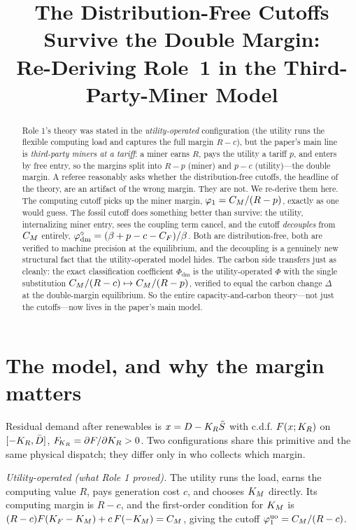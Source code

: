 \title[The cutoffs in the paper's main model]{The Distribution-Free Cutoffs Survive the Double
Margin:\\ Re-Deriving Role~1 in the Third-Party-Miner Model}


\begin{abstract}
Role 1's theory was stated in the \emph{utility-operated} configuration (the utility runs the
flexible computing load and captures the full margin $R-c$), but the paper's main line is
\emph{third-party miners at a tariff}: a miner earns $R$, pays the utility a tariff $p$, and
enters by free entry, so the margins split into $R-p$ (miner) and $p-c$ (utility)---the double
margin. A referee reasonably asks whether the distribution-free cutoffs, the headline of the
theory, are an artifact of the wrong margin. They are not. We re-derive them here. The
computing cutoff picks up the miner margin, $\varphi_1=C_M/(R-p)$, exactly as one would guess.
The fossil cutoff does something better than survive: the utility, internalizing miner entry,
sees the coupling term cancel, and the cutoff \emph{decouples} from $C_M$ entirely,
$\varphi^{\circ}_{\mathrm{dm}}=(\beta+p-c-C_F)/\beta$. Both are distribution-free, both are verified to
machine precision at the equilibrium, and the decoupling is a genuinely new structural fact
that the utility-operated model hides. The carbon side transfers just as cleanly: the exact
classification coefficient $\Phi_{\mathrm{dm}}$ is the utility-operated $\Phi$ with the single
substitution $C_M/(R-c)\mapsto C_M/(R-p)$, verified to equal the carbon change $\Delta$ at the
double-margin equilibrium. So the entire capacity-and-carbon theory---not just the cutoffs---now
lives in the paper's main model.
\end{abstract}


\section{The model, and why the margin matters}
Residual demand after renewables is $x=D-K_R\tilde S$ with c.d.f. $F(x;K_R)$ on
$[-K_R,\bar D]$, $F_{\!K_R}=\partial F/\partial K_R>0$. Two configurations share this primitive and
the same physical dispatch; they differ only in who collects which margin.

\emph{Utility-operated (what Role 1 proved).} The utility runs the load, earns the computing
value $R$, pays generation cost $c$, and chooses $K_M$ directly. Its computing margin is
$R-c$, and the first-order condition for $K_M$ is
$(R-c)F(K_F-K_M)+c\,F(-K_M)=C_M$, giving the cutoff $\varphi_1^{\mathrm{uo}}=C_M/(R-c)$.

